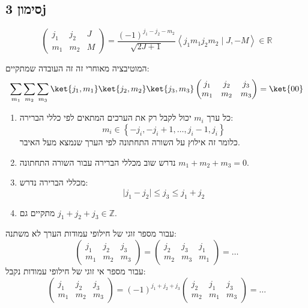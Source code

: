 \documentclass{tstextbook}
\begin{document}
\subsection{סימון 3j}

\begin{definition}[סימון 3j]
$$\begin{pmatrix}j_{1} & j_{2} & J \\m_{1} & m_{2} & M 
\end{pmatrix}= \frac{(-1)^{j_{1}-j_{2}-m_{2}}}{\sqrt{ 2J+1 }}\left\langle  j_{1}m_{1}j_{2}m_{2}\mid J,-M  \right\rangle \in \mathbb{R}$$

\end{definition}
\begin{remark}
המוטיבציה מאוחרי זה זה העובדה שמתקיים:
$$\sum_{m_{1}}\sum_{m_{2}}\sum_{m_{3}}\ket{j_{1},m_{1}} \ket{j_{2},m_{2}} \ket{j_{3},m_{3}} \begin{pmatrix}j_{1} & j_{2} & j_{3} \\m_{1} & m_{2} & m_{3}
\end{pmatrix}=\ket{00} $$

\end{remark}
\begin{proposition}
  \begin{enumerate}
    \item כל ערך \(m_{i}\) יכול לקבל רק את הערכים המתאים לפי כללי הברירה: 
$$m_{i}\in \left\{  -j_{i},-j_{i}+1 ,\dots ,j_{i}-1, j_{i}  \right\}$$
כלומר זה אילוץ על השורה התחתונה לפי הערך שנמצא מעל האיבר.


    \item נדרש שוב מכללי הברירה עבור השורה התחתונה \(m_{1}+m_{2}+m_{3}=0\). 


    \item מכללי הברירה נדרש: 
$$\lvert j_{1}-j_{2} \rvert \leq j_{3}\leq j_{1}+j_{2}$$


    \item מתקיים גם \(j_{1}+j_{2}+j_{3} \in \mathbb{Z}\). 


  \end{enumerate}
\end{proposition}
\begin{proposition}
עבור מספר זוגי של חילופי עמודות הערך לא משתנה:
$$\begin{pmatrix}j_{1} & j_{2} & j_{3} \\m_{1} & m_{2} & m_{3}\end{pmatrix}=\begin{pmatrix}j_{2} & j_{3} & j_{1} \\m_{2} & m_{3} & m_{1}
\end{pmatrix}=\dots$$
עבור מספר אי זוגי של חילופי עמודות נקבל:
$$\begin{pmatrix}j_{1} & j_{2} & j_{3} \\m_{1} & m_{2} & m_{3} \end{pmatrix}=(-1)^{j_{1}+j_{2}+j_{3}} \begin{pmatrix}j_{2} & j_{1} & j_{3} \\m_{2} & m_{1} & m_{3}
\end{pmatrix}=\dots$$

\end{proposition}
\end{document}

